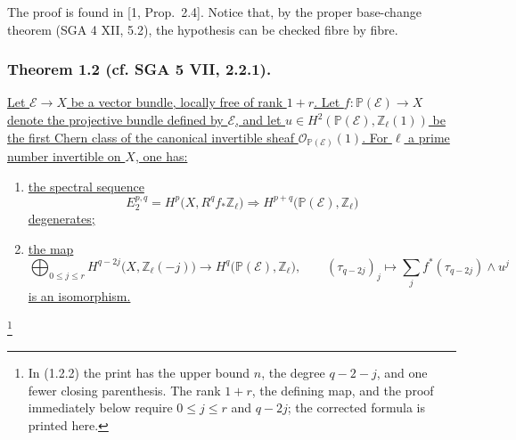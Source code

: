 The proof is found in [1, Prop.~2.4]. Notice that, by the proper base-change
theorem (SGA 4 XII, 5.2), the hypothesis can be checked fibre by fibre.

\subsubsection*{Theorem 1.2 (cf. SGA 5 VII, 2.2.1).}
\underline{Let $\mathcal E\longrightarrow X$ be a vector bundle, locally
free of rank $1+r$. Let $f:\mathbb P(\mathcal E)\longrightarrow X$ denote
the projective bundle defined by $\mathcal E$, and let
$u\in H^2(\mathbb P(\mathcal E),\mathbb Z_\ell(1))$ be the first Chern
class of the canonical invertible sheaf
$\mathcal O_{\mathbb P(\mathcal E)}(1)$. For $\ell$ a prime number
invertible on $X$, one has:}
\begin{enumerate}[label=\alph*)]
\item \underline{the spectral sequence}
\begin{equation}\tag{1.2.1}
E_2^{p,q}=H^p\bigl(X,R^qf_*\mathbb Z_\ell\bigr)
\Longrightarrow
H^{p+q}\bigl(\mathbb P(\mathcal E),\mathbb Z_\ell\bigr)
\end{equation}
\underline{degenerates;}
\item \underline{the map}
\begin{equation}\tag{1.2.2}
\bigoplus_{0\leq j\leq r}
H^{q-2j}\bigl(X,\mathbb Z_\ell(-j)\bigr)
\longrightarrow
H^q\bigl(\mathbb P(\mathcal E),\mathbb Z_\ell\bigr),
\qquad
(\tau_{q-2j})_j\longmapsto
\sum_j f^*(\tau_{q-2j})\wedge u^j
\end{equation}
\underline{is an isomorphism.}
\end{enumerate}
\footnote{In (1.2.2) the print has the upper bound $n$, the degree
$q-2-j$, and one fewer closing parenthesis. The rank $1+r$, the defining
map, and the proof immediately below require $0\leq j\leq r$ and $q-2j$;
the corrected formula is printed here.}

